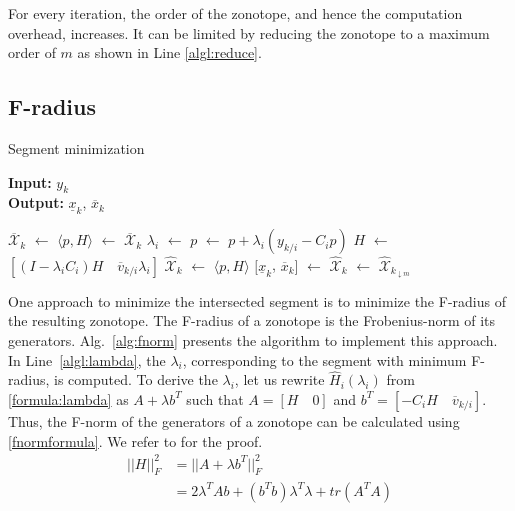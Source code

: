For every iteration, the order of the zonotope, and hence the computation overhead, increases. It can be limited by reducing the zonotope to a maximum order of $m$ as shown in Line \ref{algl:reduce}.

\subsection{F-radius}
\begin{algorithm}[H]
        \caption{Segment minimization}
        \textbf{Input:} $y_k$\\
 		\textbf{Output:} $\underline{x}_k$, $\overline{x}_k$
        \begin{algorithmic}[1]
        \State $\overline{\mathcal{X}}_k$ $\gets$ 
        \State $\langle p,H \rangle$ $\gets$ $\overline{\mathcal{X}}_k$
        	\State $\lambda_i$ $\gets$  \label{algl:lambda}
        	\State $p$ $\gets$ $p + \lambda_i (y_{k/i} - C_i p)$ \label{algl:center}
        	\State $H$ $\gets$ $[(I- \lambda_i C_i)H \quad \overline{v}_{k/i}\lambda_i]$  \label{algl:g}
        \EndFor
        \State $\hat{\mathcal{X}}_k$ $\gets$ $\langle p, H \rangle$
        \State $[\underline{x}_k$, $\overline{x}_k]$ $\gets$ 
        \State $\hat{\mathcal{X}}_k$ $\gets$ $\hat{\mathcal{X}}_{k_{\downarrow m}}$
        \end{algorithmic}
        \label{alg:fnorm}
\end{algorithm}
One approach to minimize the intersected segment is to minimize the F-radius of the resulting zonotope. The F-radius of a zonotope is the Frobenius-norm of its generators. Alg.~\ref{alg:fnorm} presents the algorithm to implement this approach.\\
In Line~\ref{algl:lambda}, the $\lambda_i$, corresponding to the segment with minimum F-radius, is computed. To derive the $\lambda_i$, let us rewrite $\hat{H}_i(\lambda_i)$ from \eqref{formula:lambda} as $A + \lambda b^T$ such that $A= [H \quad 0]$ and $b^T = [-C_i H \quad \overline{v}_{k/i}]$. Thus, the F-norm of the generators of a zonotope can be calculated using \eqref{fnormformula}. We refer to \cite{Alamo2005} for the proof.
\begin{equation}
\label{fnormformula}
\begin{split}
||H||_{F}^2 & = ||A + \lambda b^T||^{2}_F \\
&= 2\lambda^T A b+ (b^Tb)\lambda^T\lambda + tr(A^TA)
\end{split}
\end{equation}

